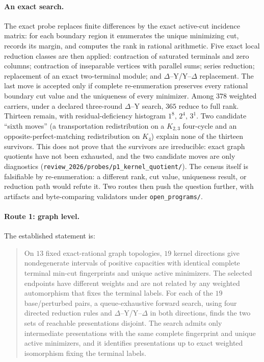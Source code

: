 \paragraph{An exact search.} The exact probe replaces finite differences by the exact active-cut incidence matrix: for
each boundary region it enumerates the unique minimizing cut, records its margin, and computes the rank in rational
arithmetic. Five exact local reduction classes are then applied: contraction of saturated terminals and zero columns;
contraction of inseparable vertices with parallel sums; series reduction; replacement of an exact two-terminal module;
and \(\Delta\)--Y/Y--\(\Delta\) replacement. The last move is accepted only if complete re-enumeration preserves every
rational boundary cut value and the uniqueness of every minimizer. Among \(378\) weighted carriers, under a declared
three-round \(\Delta\)--Y search, \(365\) reduce to full rank. Thirteen remain, with residual-deficiency histogram
\(1^8,\,2^4,\,3^1\). Two candidate ``sixth moves'' (a transportation redistribution on a \(K_{2,3}\) four-cycle and an
opposite-perfect-matching redistribution on \(K_4\)) explain none of the thirteen survivors. This does not prove that
the survivors are irreducible: exact graph quotients have not been exhausted, and the two candidate moves are only
diagnostics (\nolinkurl{review_2026/probes/p1_kernel_quotient/}). The census itself is falsifiable by re-enumeration:
a different rank, cut value, uniqueness result, or reduction path would refute it. Two routes then push the question
further, with artifacts and byte-comparing validators under \nolinkurl{open_programs/}.

\paragraph{Route 1: graph level.} The established statement is:

\begin{quote}
On \(13\) fixed exact-rational graph topologies, \(19\) kernel directions give nondegenerate intervals of positive
capacities with identical complete terminal min-cut fingerprints and unique active minimizers. The selected endpoints
have different weights and are not related by any weighted automorphism that fixes the terminal labels. For each of the
\(19\) base/perturbed pairs, a queue-exhaustive forward search, using four directed reduction rules and
\(\Delta\)--Y/Y--\(\Delta\) in both directions, finds the two sets of reachable presentations disjoint. The search
admits only intermediate presentations with the same complete fingerprint and unique active minimizers, and it
identifies presentations up to exact weighted isomorphism fixing the terminal labels.
\end{quote}


